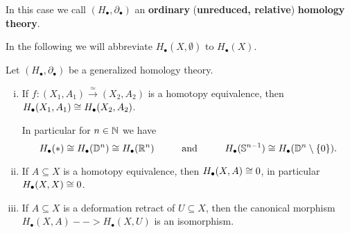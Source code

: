 \begin{definition}
\begin{enumerate}[$\bullet$]
{			In this case we call $(H_\bullet,\partial_\bullet)$ an \textbf{ordinary} (\textbf{unreduced, relative}) \textbf{homology theory}.
		}
	\end{enumerate}
	\end{definition}

	In the following we will abbreviate $H_\bullet(X,\emptyset)$ to $H_\bullet(X)$.

	\begin{lemma}
		Let $(H_\bullet, \partial_\bullet)$ be a generalized homology theory.
		\begin{enumerate}[(i)]
			\item{
				If $f:(X_1,A_1) \xrightarrow{\simeq} (X_2,A_2)$ is a homotopy equivalence, then $H_\bullet(X_1,A_1) \cong H_\bullet(X_2,A_2)$.

				In particular for $n \in \mathbb{N}$ we have
				\begin{equation*}
					H_\bullet(*) \cong H_\bullet(\mathbb{D}^n) \cong H_\bullet(\mathbb{R}^n) \hspace{1cm}\text{and}\hspace{1cm} H_\bullet(\mathbb{S}^{n-1}) \cong H_\bullet(\mathbb{D}^n \setminus \{0\}).
				\end{equation*}
			}
			\item{
				If $A \subseteq X$ is a homotopy equivalence, then $H_\bullet(X,A) \cong 0$, in particular $H_\bullet(X,X) \cong 0$.
			}
			\item{
				If $A \subseteq X$ is a deformation retract of $U \subseteq X$, then the canonical morphism $H_\bullet(X,A) --> H_\bullet(X,U)$ is an isomorphism.
			}
		\end{enumerate}
	\end{lemma}

